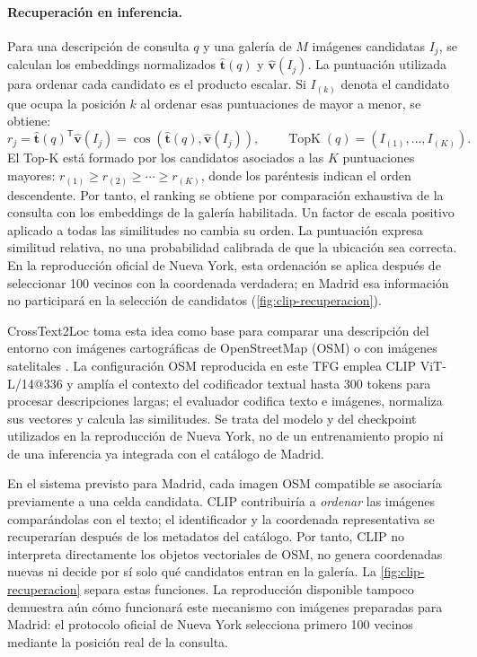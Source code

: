 \paragraph{Recuperación en inferencia.}
Para una descripción de consulta \(q\) y una galería de \(M\) imágenes candidatas \(I_j\), se calculan los embeddings normalizados \(\hat{\mathbf{t}}(q)\) y \(\hat{\mathbf{v}}(I_j)\). La puntuación utilizada para ordenar cada candidato es el producto escalar. Si \(I_{(k)}\) denota el candidato que ocupa la posición \(k\) al ordenar esas puntuaciones de mayor a menor, se obtiene:
\begin{equation}
  r_j=\hat{\mathbf{t}}(q)^{\mathsf T}\hat{\mathbf{v}}(I_j)
      =\cos\!\left(\hat{\mathbf{t}}(q),\hat{\mathbf{v}}(I_j)\right),
  \qquad
  \operatorname{TopK}(q)=\left(I_{(1)},\ldots,I_{(K)}\right).
  \label{eq:clip-topk}
\end{equation}
El Top-K está formado por los candidatos asociados a las \(K\) puntuaciones mayores: \(r_{(1)}\geq r_{(2)}\geq\cdots\geq r_{(K)}\), donde los paréntesis indican el orden descendente. Por tanto, el ranking se obtiene por comparación exhaustiva de la consulta con los embeddings de la galería habilitada. Un factor de escala positivo aplicado a todas las similitudes no cambia su orden. La puntuación expresa similitud relativa, no una probabilidad calibrada de que la ubicación sea correcta. En la reproducción oficial de Nueva York, esta ordenación se aplica después de seleccionar 100 vecinos con la coordenada verdadera; en Madrid esa información no participará en la selección de candidatos (\cref{fig:clip-recuperacion}).



CrossText2Loc toma esta idea como base para comparar una descripción del entorno con imágenes cartográficas de OpenStreetMap (OSM) o con imágenes satelitales \cite{ye2025crosstext}. La configuración OSM reproducida en este TFG emplea CLIP ViT-L/14@336 y amplía el contexto del codificador textual hasta 300 tokens para procesar descripciones largas; el evaluador codifica texto e imágenes, normaliza sus vectores y calcula las similitudes. Se trata del modelo y del checkpoint utilizados en la reproducción de Nueva York, no de un entrenamiento propio ni de una inferencia ya integrada con el catálogo de Madrid.

En el sistema previsto para Madrid, cada imagen OSM compatible se asociaría previamente a una celda candidata. CLIP contribuiría a \emph{ordenar} las imágenes comparándolas con el texto; el identificador y la coordenada representativa se recuperarían después de los metadatos del catálogo. Por tanto, CLIP no interpreta directamente los objetos vectoriales de OSM, no genera coordenadas nuevas ni decide por sí solo qué candidatos entran en la galería. La \cref{fig:clip-recuperacion} separa estas funciones. La reproducción disponible tampoco demuestra aún cómo funcionará este mecanismo con imágenes preparadas para Madrid: el protocolo oficial de Nueva York selecciona primero 100 vecinos mediante la posición real de la consulta.

